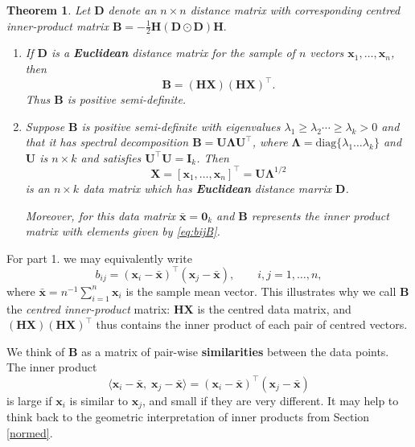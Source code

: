 \documentclass[]{book}
\newtheorem{theorem}{Theorem}[chapter]
\theoremstyle{definition}
\theoremstyle{definition}
\theoremstyle{definition}
\theoremstyle{remark}
\begin{document}
\begin{theorem}
\protect\hypertarget{thm:five1}{}{\label{thm:five1} }Let \(\mathbf D\) denote an \(n \times n\) distance matrix with corresponding centred inner-product matrix \(\mathbf B=-\frac{1}{2}\mathbf H(\mathbf D\odot\mathbf D)\mathbf H.\)

\begin{enumerate}
\def\labelenumi{\arabic{enumi}.}
\item
  If \(\mathbf D\) is a \textbf{Euclidean} distance matrix for the sample of \(n\) vectors \(\mathbf x_1,\ldots , \mathbf x_n\), then
  \begin{equation}
  \mathbf B= ({\mathbf H} {\mathbf X})({\mathbf H} {\mathbf X})^\top.
  \label{eq:bijB}
  \end{equation}
  Thus \(\mathbf B\) is positive semi-definite.
\item
  Suppose \(\mathbf B\) is positive semi-definite with eigenvalues \(\lambda_1 \geq \lambda_2 \cdots \geq \lambda_k > 0\) and that it has spectral decomposition \(\mathbf B={\mathbf U} {\pmb \Lambda}{\mathbf U}^\top\), where \({\pmb \Lambda}=\text{diag}\{\lambda_1 \ldots \lambda_k\}\) and \(\mathbf U\) is \(n \times k\) and satisfies \({\mathbf U}^\top {\mathbf U}={\mathbf I}_k\). Then
  \[{\mathbf X}=[\mathbf x_1, \ldots , \mathbf x_n]^\top={\mathbf U}{\pmb \Lambda}^{1/2}\]
  is an \(n \times k\) data matrix which has \textbf{Euclidean} distance marrix \(\mathbf D\).

  Moreover, for this data matrix \(\bar{\mathbf x}={\mathbf 0}_k\) and \(\mathbf B\) represents the inner product matrix with elements given by \eqref{eq:bijB}.
\end{enumerate}
\end{theorem}

For part 1. we may equivalently write
\begin{equation}
b_{ij}=(\mathbf x_i-\bar{\mathbf x})^\top (\mathbf x_j - \bar{\mathbf x}), \qquad i,j=1,\ldots , n,
\end{equation}
where \(\bar{\mathbf x}=n^{-1}\sum_{i=1}^n \mathbf x_i\) is the sample mean vector.
This illustrates why we call \(\mathbf B\) the \emph{centred inner-product} matrix: \(\mathbf H\mathbf X\) is the centred data matrix, and \((\mathbf H\mathbf X)(\mathbf H\mathbf X)^\top\) thus contains the inner product of each pair of centred vectors.

We think of \(\mathbf B\) as a matrix of pair-wise \textbf{similarities} between the data points. The inner product \[\langle \mathbf x_i-\bar{\mathbf x}, \;\mathbf x_j - \bar{\mathbf x} \rangle=(\mathbf x_i-\bar{\mathbf x})^\top (\mathbf x_j - \bar{\mathbf x})\] is large if \(\mathbf x_i\) is similar to \(\mathbf x_j\), and small if they are very different. It may help to think back to the geometric interpretation of inner products from Section \ref{normed}.
\end{document}
